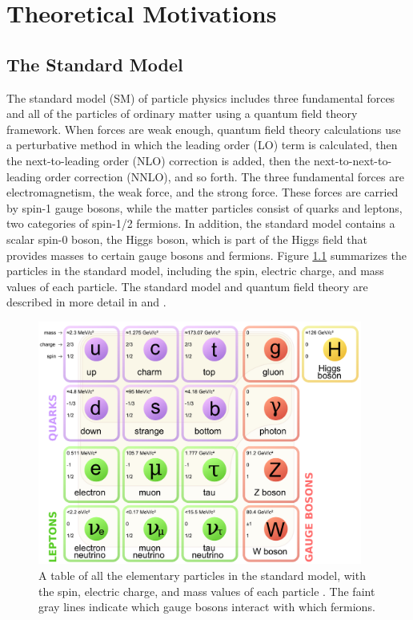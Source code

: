 \chapter{Theoretical Motivations
\label{ch:theory}}

\setcounter{section}{-1}

\section{The Standard Model}

The standard model (SM) of particle physics includes three fundamental forces and all of the particles of ordinary matter using a quantum field theory framework. When forces are weak enough, quantum field theory calculations use a perturbative method in which the leading order (LO) term is calculated, then the next-to-leading order (NLO) correction is added, then the next-to-next-to-leading order correction (NNLO), and so forth. The three fundamental forces are electromagnetism, the weak force, and the strong force. These forces are carried by spin-1 gauge bosons, while the matter particles consist of quarks and leptons, two categories of spin-1/2 fermions. In addition, the standard model contains a scalar spin-0 boson, the Higgs boson, which is part of the Higgs field that provides masses to certain gauge bosons and fermions. Figure \ref{fig:sm-particles} summarizes the particles in the standard model, including the spin, electric charge, and mass values of each particle. The standard model and quantum field theory are described in more detail in \cite{Griffiths} and \cite{Peskin}.

\begin{figure}[hbt]
\begin{center}
\includegraphics[width=0.95\textwidth]{figures/Standard_Model_of_Elementary_Particles.pdf}
\caption{A table of all the elementary particles in the standard model, with the spin, electric charge, and mass values of each particle \cite{MissMJ}. The faint gray lines indicate which gauge bosons interact with which fermions.}
\label{fig:sm-particles}
\end{center}
\end{figure}

